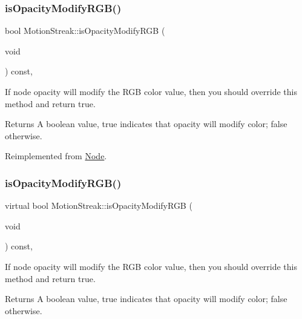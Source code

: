 \subsubsection{\texorpdfstring{is\+Opacity\+Modify\+R\+G\+B()}{isOpacityModifyRGB()}\hspace{0.1cm}{\footnotesize\ttfamily [1/2]}}
{\footnotesize\ttfamily bool Motion\+Streak\+::is\+Opacity\+Modify\+R\+GB (\begin{DoxyParamCaption}\item[{void}]{ }\end{DoxyParamCaption}) const\hspace{0.3cm}{\ttfamily [override]}, {\ttfamily [virtual]}}

If node opacity will modify the R\+GB color value, then you should override this method and return true. \begin{DoxyReturn}{Returns}
A boolean value, true indicates that opacity will modify color; false otherwise. 
\end{DoxyReturn}


Reimplemented from \hyperlink{classNode_ae6ce32d2088e2bb3426608334f1091c5}{Node}.

\mbox{\label{classMotionStreak_a74c2b98555067ccd7d069273f9569aba}} 
\subsubsection{\texorpdfstring{is\+Opacity\+Modify\+R\+G\+B()}{isOpacityModifyRGB()}\hspace{0.1cm}{\footnotesize\ttfamily [2/2]}}
{\footnotesize\ttfamily virtual bool Motion\+Streak\+::is\+Opacity\+Modify\+R\+GB (\begin{DoxyParamCaption}\item[{void}]{ }\end{DoxyParamCaption}) const\hspace{0.3cm}{\ttfamily [override]}, {\ttfamily [virtual]}}

If node opacity will modify the R\+GB color value, then you should override this method and return true. \begin{DoxyReturn}{Returns}
A boolean value, true indicates that opacity will modify color; false otherwise. 
\end{DoxyReturn}


